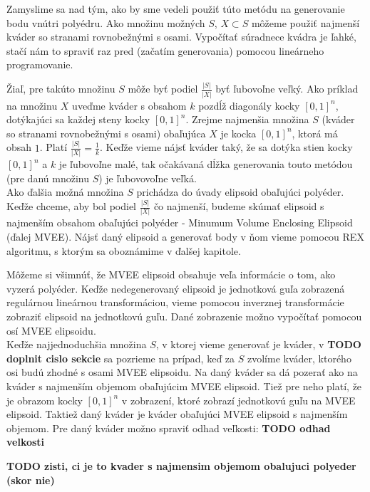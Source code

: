 Zamyslime sa nad tým, ako by sme vedeli použiť túto metódu na generovanie bodu vnútri polyédru. Ako množinu možných $S$, $X \subset S$ môžeme použiť najmenší kváder so stranami rovnobežnými s osami. Vypočítať súradnece kvádra je ľahké, stačí nám to spraviť raz pred (začatím generovania) pomocou lineárneho programovanie.

Žiaľ, pre takúto množinu $S$ môže byť podiel $\frac{|S|}{|X|}$ byť ľubovoľne veľký. Ako príklad na množinu $X$ uveďme kváder s obsahom $k$ pozdĺž diagonály kocky $[0,1]^n$, dotýkajúci sa každej steny kocky $[0,1]^n$. Zrejme najmenšia množina $S$ (kváder so stranami rovnobežnými s osami) obaľujúca $X$ je kocka $[0,1]^n$, ktorá má obsah $1$. Platí $\frac{|S|}{|X|}=\frac{1}{k}$. Keďže vieme nájsť kváder taký, že sa dotýka stien kocky $[0,1]^n$ a $k$ je ľubovoľne malé, tak očakávaná dĺžka generovania touto metódou (pre danú množinu $S$) je ľubovovoľne veľká.\\

Ako ďalšia možná množina $S$ prichádza do úvady elipsoid obaľujúci polyéder. Keďže chceme, aby bol podiel $\frac{|S|}{|X|}$ čo najmenší, budeme skúmať elipsoid s najmenším obsahom obaľujúci polyéder - Minumum Volume Enclosing Elipsoid (ďalej MVEE). Nájsť daný elipsoid a generovať body v ňom vieme pomocou REX algoritmu, s ktorým sa oboznámime v ďalšej kapitole.

Môžeme si všimnúť, že MVEE elipsoid obsahuje veľa informácie o tom, ako vyzerá polyéder. Keďže nedegenerovaný elipsoid je jednotková guľa zobrazená regulárnou lineárnou transformáciou, vieme pomocou inverznej transformácie zobraziť elipsoid na jednotkovú guľu. Dané zobrazenie možno vypočítať pomocou osí MVEE elipsoidu.\\

Keďže najjednoduchšia množina $S$, v ktorej vieme generovať je kváder, v \textbf{TODO doplnit cislo sekcie} sa pozrieme na prípad, keď za $S$ zvolíme kváder, ktorého osi budú zhodné s osami MVEE elipsoidu. Na daný kváder sa dá pozerať ako na kváder s najmenším objemom obaľujúcim MVEE elipsoid. Tiež pre neho platí, že je obrazom kocky $[0,1]^n$ v zobrazení, ktoré zobrazí jednotkovú guľu na MVEE elipsoid. Taktiež daný kváder je kváder obaľujúci MVEE elipsoid s najmenším objemom. Pre daný kváder možno spraviť odhad veľkosti:
\textbf{TODO odhad velkosti}

\textbf{TODO zisti, ci je to kvader s najmensim objemom obalujuci polyeder (skor nie)}


